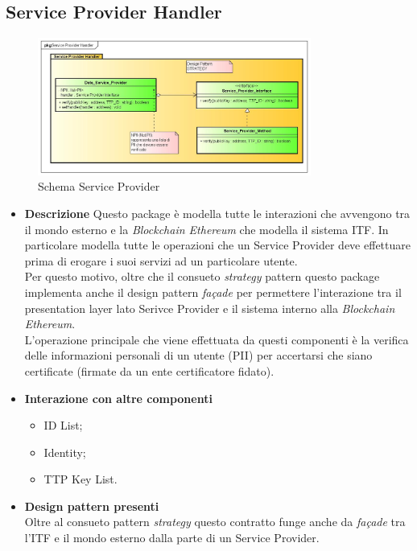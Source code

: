 \subsection{Service Provider Handler}
\begin{figure}[!h]
	\centering
	\includegraphics[width=0.8\textwidth]{immagini/serviceproviderhandler}
	\caption{Schema Service Provider}
\end{figure}
\begin{itemize}
	\item \textbf{Descrizione}
	Questo package è modella tutte le interazioni che avvengono tra il mondo esterno e la \textit{Blockchain Ethereum} che modella il sistema \gls{ITF}. In particolare modella tutte le operazioni che un Service Provider deve effettuare prima di erogare i suoi servizi ad un particolare utente.\\
	Per questo motivo, oltre che il consueto \textit{strategy} pattern questo package implementa anche il design pattern \textit{façade} per permettere l'interazione tra il presentation layer lato Serivce Provider e il sistema interno alla \textit{Blockchain Ethereum}.\\
	L'operazione principale che viene effettuata da questi componenti è la verifica delle informazioni personali di un utente (\gls{PII}) per accertarsi che siano certificate (firmate da un ente certificatore fidato).
	\item \textbf{Interazione con altre componenti}
	\begin{itemize}
		\item ID List;
		\item Identity;
		\item TTP Key List.
	\end{itemize}
	\item \textbf{Design pattern presenti}\\
	Oltre al consueto pattern \textit{strategy} questo contratto funge anche da \textit{façade} tra l'\gls{ITF} e il mondo esterno dalla parte di un Service Provider.
\end{itemize}
